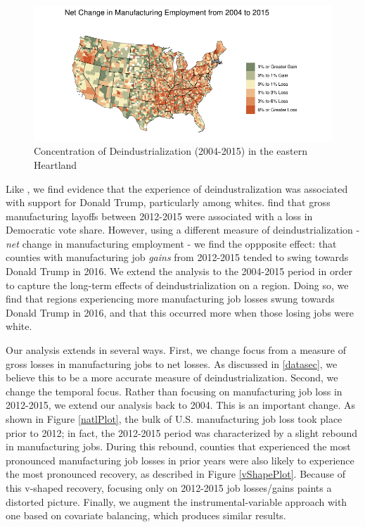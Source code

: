 \documentclass[]{AEA}
\begin{document}
\begin{figure} \label{ManuMap}
\caption{Concentration of Deindustrialization (2004-2015) in the eastern Heartland}

\begin{center}\includegraphics{Final-Draft_files/figure-latex/unnamed-chunk-2-1} \end{center}

\end{figure}

Like \cite{Baccini21}, we find evidence that the experience of
deindustralization was associated with support for Donald Trump,
particularly among whites. \cite{Baccini21} find that gross
manufacturing layoffs between 2012-2015 were associated with a loss in
Democratic vote share. However, using a different measure of
deindustrialization - \emph{net} change in manufacturing employment - we
find the oppposite effect: that counties with manufacturing job
\emph{gains} from 2012-2015 tended to swing towards Donald Trump in
2016. We extend the analysis to the 2004-2015 period in order to capture
the long-term effects of deindustrialization on a region. Doing so, we
find that regions experiencing more manufacturing job losses swung
towards Donald Trump in 2016, and that this occurred more when those
losing jobs were white.

Our analysis extends \cite{Baccini21} in several ways. First, we change
focus from a measure of gross losses in manufacturing jobs to net
losses. As discussed in \ref{datasec}, we believe this to be a more
accurate measure of deindustrialization. Second, we change the temporal
focus. Rather than focusing on manufacturing job loss in 2012-2015, we
extend our analysis back to 2004. This is an important change. As shown
in Figure \ref{natlPlot}, the bulk of U.S. manufacturing job loss took
place prior to 2012; in fact, the 2012-2015 period was characterized by
a slight rebound in manufacturing jobs. During this rebound, counties
that experienced the most pronounced manufacturing job losses in prior
years were also likely to experience the most pronounced recovery, as
described in Figure \ref{vShapePlot}. Because of this v-shaped recovery,
focusing only on 2012-2015 job losses/gains paints a distorted picture.
Finally, we augment the instrumental-variable approach with one based on
covariate balancing, which produces similar results.
\end{document}

